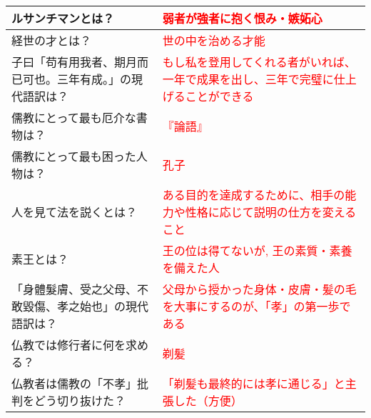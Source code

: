 \documentclass[a4paper,10pt]{article}
\begin{document}
\begin{longtable}{|p{}|p{}|}
ルサンチマンとは？ & \textcolor{red}{弱者が強者に抱く恨み・嫉妬心} \\ \hline
経世の才とは？ & \textcolor{red}{世の中を治める才能} \\ \hline
子曰「苟有用我者、期月而已可也。三年有成。」の現代語訳は？ & \textcolor{red}{もし私を登用してくれる者がいれば、一年で成果を出し、三年で完璧に仕上げることができる} \\ \hline
儒教にとって最も厄介な書物は？ & \textcolor{red}{『論語』} \\ \hline
儒教にとって最も困った人物は？ & \textcolor{red}{孔子} \\ \hline
人を見て法を説くとは？ & \textcolor{red}{ある目的を達成するために、相手の能力や性格に応じて説明の仕方を変えること} \\ \hline
素王とは？ & \textcolor{red}{王の位は得てないが, 王の素質・素養を備えた人} \\ \hline
「身體髮膚、受之父母、不敢毀傷、孝之始也」の現代語訳は？ & \textcolor{red}{父母から授かった身体・皮膚・髪の毛を大事にするのが、「孝」の第一歩である} \\ \hline
仏教では修行者に何を求める？ & \textcolor{red}{剃髪} \\ \hline
仏教者は儒教の「不孝」批判をどう切り抜けた？ & \textcolor{red}{「剃髪も最終的には孝に通じる」と主張した（方便）} \\ \hline
\end{longtable}
\end{document}
